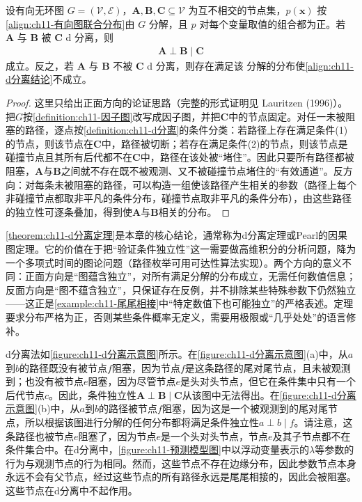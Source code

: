 \documentclass[../../main.tex]{subfiles}
\begin{document}
\begin{theorem}[d 分离判定]\label{theorem:ch11-d分离定理}
设有向无环图 $G=(\mathcal{V},\mathcal{E})$，$\mathbf{A},\mathbf{B},\mathbf{C}\subseteq
\mathcal{V}$ 为互不相交的节点集，$p(\mathbf{x})$ 按
\eqref{align:ch11-有向图联合分布}由 $G$ 分解，且 $p$ 对每个变量取值的组合都为正。若
$\mathbf{A}$ 与 $\mathbf{B}$ 被 $\mathbf{C}$ d 分离，则
\begin{align}
  \mathbf{A}\perp\mathbf{B}\mid\mathbf{C}
  \label{align:ch11-d分离结论}
\end{align}
成立。反之，若 $\mathbf{A}$ 与 $\mathbf{B}$ 不被 $\mathbf{C}$ d 分离，则存在满足该
分解的分布使\eqref{align:ch11-d分离结论}不成立。
\end{theorem}

\begin{proof}
这里只给出正面方向的论证思路（完整的形式证明见 Lauritzen (1996)）。把$G$按\cref{definition:ch11-因子图}改写成因子图，并把$\mathbf{C}$中的节点固定。对任一未被阻塞的路径，逐点按\cref{definition:ch11-d分离}的条件分类：若路径上存在满足条件(1)的节点，则该节点在$\mathbf{C}$中，路径被切断；若存在满足条件(2)的节点，则该节点是碰撞节点且其所有后代都不在$\mathbf{C}$中，路径在该处被“堵住”。因此只要所有路径都被阻塞，$\mathbf{A}$与$\mathbf{B}$之间就不存在既不被观测、又不被碰撞节点堵住的“有效通道”。反方向：对每条未被阻塞的路径，可以构造一组使该路径产生相关的参数（路径上每个非碰撞节点都取非平凡的条件分布，碰撞节点取非平凡的条件分布），由这些路径的独立性可逐条叠加，得到使$\mathbf{A}$与$\mathbf{B}$相关的分布。
\end{proof}

\begin{remark}
\cref{theorem:ch11-d分离定理}是本章的核心结论，通常称为d分离定理或Pearl的因果图定理。它的价值在于把“验证条件独立性”这一需要做高维积分的分析问题，降为一个多项式时间的图论问题（路径枚举可用可达性算法实现）。两个方向的意义不同：正面方向是“图蕴含独立”，对所有满足分解的分布成立，无需任何数值信息；反面方向是“图不蕴含独立”，只保证存在反例，并不排除某些特殊参数下仍然独立——这正是\cref{example:ch11-尾尾相接}中“特定数值下也可能独立”的严格表述。定理要求分布严格为正，否则某些条件概率无定义，需要用极限或“几乎处处”的语言修补。
\end{remark}

d分离法如\cref{figure:ch11-d分离示意图}所示。在\cref{figure:ch11-d分离示意图}(a)中，从$a$到$b$的路径既没有被节点$f$阻塞，因为节点$f$是这条路径的尾对尾节点，且未被观测到；也没有被节点$e$阻塞，因为尽管节点$e$是头对头节点，但它在条件集中只有一个后代节点$c$。因此，条件独立性$\mathbf{A}\perp\mathbf{B}\mid\mathbf{C}$从该图中无法得出。在\cref{figure:ch11-d分离示意图}(b)中，从$a$到$b$的路径被节点$f$阻塞，因为这是一个被观测到的尾对尾节点，所以根据该图进行分解的任何分布都将满足条件独立性$a\perp b\mid f$。请注意，这条路径也被节点$e$阻塞了，因为节点$e$是一个头对头节点，节点$e$及其子节点都不在条件集合中。在d分离中，\cref{figure:ch11-预测模型图}中以浮动变量表示的$\lambda$等参数的行为与观测节点的行为相同。然而，这些节点不存在边缘分布，因此参数节点本身永远不会有父节点，经过这些节点的所有路径永远是尾尾相接的，因此会被阻塞。这些节点在d分离中不起作用。
\end{document}
